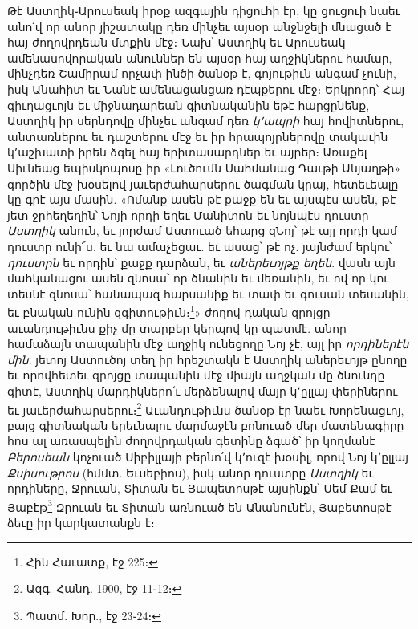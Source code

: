 \documentclass{article}
\begin{document}
{Թէ Աստղիկ֊Արուսեակ իրօք ազգային դիցուհի էր, կը ցուցուի նաեւ անո՛վ որ անոր յիշատակը դեռ մինչեւ այսօր անջնջելի մնացած է հայ ժողովրդեան մտքին մէջ։ Նախ՝ Աստղիկ եւ Արուսեակ ամենասովորական անուններ են այսօր հայ աղջիկներու համար, մինչդեռ Շամիրամ որչափ ինծի ծանօթ է, գոյութիւն անգամ չունի, իսկ Անահիտ եւ Նանէ ամենացանցառ դէպքերու մէջ։ Երկրորդ՝ Հայ գիւղացւոյն եւ միջնադարեան գիտնականին եթէ հարցընենք, Աստղիկ իր սերնդովը մինչեւ անգամ դեռ \emph{կ՚ապրի} հայ հովիտներու, անտառներու եւ դաշտերու մէջ եւ իր հրապոյրներովը տակաւին կ՚աշխատի իրեն ձգել հայ երիտասարդներ եւ այրեր։ Առաքել Սիւնեաց եպիսկոպոսը իր «Լուծումն Սահմանաց Դաւթի Անյաղթի» գործին մէջ խօսելով յաւերժահարսերու ծագման կրայ, հետեւեալը կը գրէ այս մասին. «Ոմանք ասեն թէ քաջք են եւ այսպէս ասեն, թէ յետ ջրհեղեղին՝ Նոյի որդի եղեւ Մանիտոն եւ նոյնպէս դուստր \emph{Աստղիկ} անուն, եւ յորժամ Աստուած եհարց զՆոյ՝ թէ այլ որդի կամ դուստր ունի՜ս. եւ նա ամաչեցաւ. եւ ասաց՝ թէ ոչ. յայնժամ երկու՝ \emph{դուստրն} եւ որդին՝ քաջք դարձան, եւ \emph{աներեւոյթք եղեն}. վասն այն մահկանացու ասեն զնոսա՝ որ ծնանին եւ մեռանին, եւ ով որ կու տեսնէ զնոսա՝ հանապազ հարսանիք եւ տափ եւ գուսան տեսանին, եւ բնական ունին զգիտութիւն։\footnote{Հին Հաւատք, էջ 225։}» ժողով դական զրոյցը աւանդութիւնս քիչ մը տարբեր կերպով կը պատմէ. անոր համաձայն տապանին մէջ աղջիկ ունեցողը Նոյ չէ, այլ իր \emph{որդիներէն մին}. յետոյ Աստուծոյ տեղ իր հրեշտակն է Աստղիկ աներեւոյթ ընողը եւ որովհետեւ զրոյցը տապանին մէջ միայն աղջկան մը ծնունդը գիտէ, Աստղիկ մարդիկներո՛ւ մերձենալով մայր կ՚ըլլայ փերիներու եւ յաւերժահարսերու։\footnote{Ազգ. Հանդ. 1900, էջ 11֊12։} Աւանդութիւնս ծանօթ էր նաեւ Խորենացւոյ, բայց գիտնական երեւնալու մարմաջէն բոնուած մեր մատենագիրը հոս ալ առասպելին ժողովրդական գետինը ձգած՝ իր կողմանէ \emph{Բերոսեան} կոչուած Սիբիլլայի բերնո՛վ կ՚ուզէ խօսիլ, որով Նոյ կ՚ըլլայ \emph{Քսիսութրոս} (հմմտ. Եւսեբիոս), իսկ անոր դուստրը \emph{Աստղիկ} եւ որդիները, Ջրուան, Տիտան եւ Յապետոսթէ այսինքն՝ Սեմ Քամ եւ Յաբէթ\footnote{Պատմ. Խոր., էջ 23֊24։} Զրուան եւ Տիտան առնուած են Անանունէն, Յաբետոսթէ ձեւը իր կարկատանքն է։

}
\end{document}
